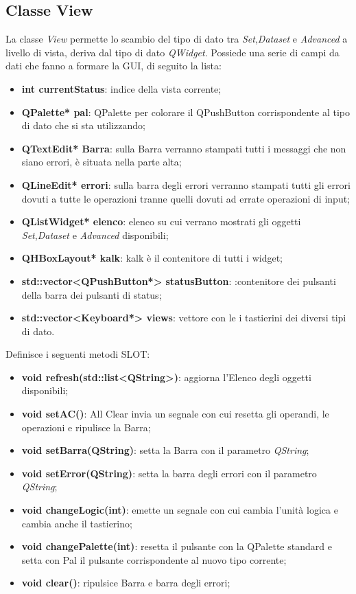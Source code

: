 \documentclass[a4paper,10pt]{article}
\begin{document}
        \subsection{Classe View}
        La classe \textit{View} permette lo scambio del tipo di dato tra \textit{Set},\textit{Dataset} e \textit{Advanced} a livello di vista, deriva dal tipo di dato \textit{QWidget}.
        Possiede una serie di campi da dati che fanno a formare la GUI, di seguito la lista:
        \begin{itemize}
            \item \textbf{int currentStatus}: indice della vista corrente;
            \item \textbf{QPalette* pal}: QPalette per colorare il QPushButton corrispondente al tipo di dato che si sta utilizzando;
            \item \textbf{QTextEdit* Barra}: sulla Barra verranno stampati tutti i messaggi che non siano errori, è situata nella parte alta;
            \item \textbf{QLineEdit* errori}: sulla barra degli errori verranno stampati tutti gli errori dovuti a tutte le operazioni tranne quelli dovuti ad errate operazioni di input;
            \item \textbf{QListWidget* elenco}: elenco su cui verrano mostrati gli oggetti \textit{Set},\textit{Dataset} e \textit{Advanced} disponibili;
            \item \textbf{QHBoxLayout* kalk}: kalk è il contenitore di tutti i widget;
            \item \textbf{std::vector<QPushButton*> statusButton}: :contenitore dei pulsanti della barra dei pulsanti di status;
            \item \textbf{std::vector<Keyboard*> views}: vettore con le i tastierini dei diversi tipi di dato.
        \end{itemize}
        Definisce i seguenti metodi SLOT:
        \begin{itemize}
            \item \textbf{void refresh(std::list<QString>)}: aggiorna l'Elenco degli oggetti disponibili;
            \item \textbf{void setAC()}: All Clear invia un segnale con cui resetta gli operandi, le operazioni e ripulisce la Barra;
            \item \textbf{void setBarra(QString)}: setta la Barra con il parametro \textit{QString};
            \item \textbf{void setError(QString)}: setta la barra degli errori con il parametro \textit{QString};
            \item \textbf{void changeLogic(int)}: emette un segnale con cui cambia l'unità logica e cambia anche il tastierino;
            \item \textbf{void changePalette(int)}: resetta il pulsante con la QPalette standard e setta con Pal il pulsante corrispondente al nuovo tipo corrente;
            \item \textbf{void clear()}: ripulsice Barra e barra degli errori;
        \end{itemize}
\end{document}
